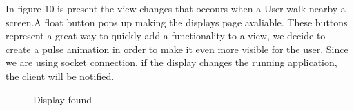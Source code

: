 \documentclass[]{usiinfbachelorproject}
\begin{document}
In figure 10 is present the view changes that occours when a User walk nearby a screen.A float button pops up making the displays page avaliable. These buttons represent a great way to quickly add a functionality to a view, we decide to create a pulse animation in order to make it even more visible for the user. Since we are using socket connection, if the display changes the running application, the client will be notified.\begin{figure}[H]
  \centering
\caption{Display found}

\end{figure}
%
\end{document}
